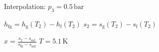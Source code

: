 Interpolation:  
\( p_3 = 0.5 \, \text{bar} \)  

\( h_{\text{fg}} = h_{\text{g}}(T_2) - h_{\text{f}}(T_2) \)  
\( s_2 = s_{\text{g}}(T_2) - s_{\text{f}}(T_2) \)  

\( x = \frac{s_2 - s_{\text{sat}}}{s_{\text{fg}} - s_{\text{sat}}} \)  
\( T = 5.1 \, \text{K} \)